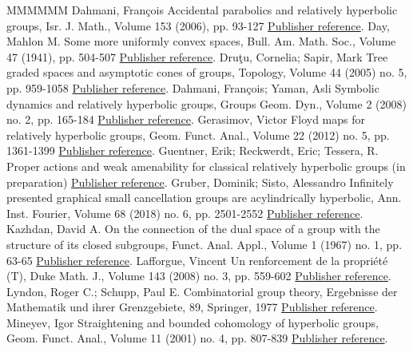 \documentclass[11pt]{article}
\theoremstyle{definition}
\numberwithin{equation}{section}
\begin{document}
\begin{thebibliography}{MMMMMM}
 Dahmani, François Accidental parabolics and relatively hyperbolic groups, Isr. J. Math., Volume 153 (2006), pp. 93-127 \href{https://ahl.centre-mersenne.org/item/AHL_2020__3__35_0/#Israel}{Publisher reference}.
 Day, Mahlon M. Some more uniformly convex spaces, Bull. Am. Math. Soc., Volume 47 (1941), pp. 504-507 \href{https://ahl.centre-mersenne.org/item/AHL_2020__3__35_0/#Day}{Publisher reference}.
 Druţu, Cornelia; Sapir, Mark Tree graded spaces and asymptotic cones of groups, Topology, Volume 44 (2005) no. 5, pp. 959-1058 \href{https://ahl.centre-mersenne.org/item/AHL_2020__3__35_0/#DS}{Publisher reference}.
 Dahmani, François; Yaman, Asli Symbolic dynamics and relatively hyperbolic groups, Groups Geom. Dyn., Volume 2 (2008) no. 2, pp. 165-184 \href{https://ahl.centre-mersenne.org/item/AHL_2020__3__35_0/#DYaman}{Publisher reference}.
 Gerasimov, Victor Floyd maps for relatively hyperbolic groups, Geom. Funct. Anal., Volume 22 (2012) no. 5, pp. 1361-1399 \href{https://ahl.centre-mersenne.org/item/AHL_2020__3__35_0/#Gera}{Publisher reference}.
 Guentner, Erik; Reckwerdt, Eric; Tessera, R. Proper actions and weak amenability for classical relatively hyperbolic groups (in preparation) \href{https://ahl.centre-mersenne.org/item/AHL_2020__3__35_0/#GRT}{Publisher reference}.
 Gruber, Dominik; Sisto, Alessandro Infinitely presented graphical small cancellation groups are acylindrically hyperbolic, Ann. Inst. Fourier, Volume 68 (2018) no. 6, pp. 2501-2552 \href{https://ahl.centre-mersenne.org/item/AHL_2020__3__35_0/#GS}{Publisher reference}.
 Kazhdan, David A. On the connection of the dual space of a group with the structure of its closed subgroups, Funct. Anal. Appl., Volume 1 (1967) no. 1, pp. 63-65 \href{https://ahl.centre-mersenne.org/item/AHL_2020__3__35_0/#Kaz}{Publisher reference}.
 Lafforgue, Vincent Un renforcement de la propriété (T), Duke Math. J., Volume 143 (2008) no. 3, pp. 559-602 \href{https://ahl.centre-mersenne.org/item/AHL_2020__3__35_0/#La}{Publisher reference}.
 Lyndon, Roger C.; Schupp, Paul E. Combinatorial group theory, Ergebnisse der Mathematik und ihrer Grenzgebiete, 89, Springer, 1977 \href{https://ahl.centre-mersenne.org/item/AHL_2020__3__35_0/#LS77}{Publisher reference}.
 Mineyev, Igor Straightening and bounded cohomology of hyperbolic groups, Geom. Funct. Anal., Volume 11 (2001) no. 4, pp. 807-839 \href{https://ahl.centre-mersenne.org/item/AHL_2020__3__35_0/#Min}{Publisher reference}.

\end{thebibliography}
\end{document}
